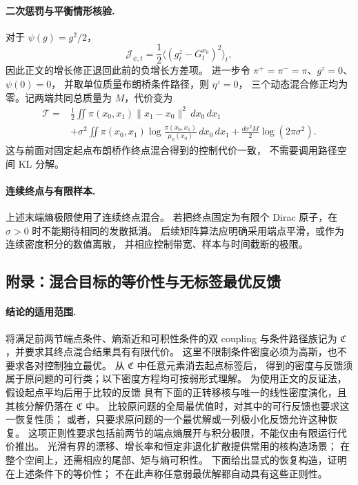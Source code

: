 \documentclass[UTF8,a4paper,11pt,fontset=fandol]{ctexart}
\begin{document}
\paragraph{二次惩罚与平衡情形核验.}
对于 $\psi(g)=g^2/2$，
\begin{equation}
\mathcal J_{\psi,t}
=\frac12\langle(g_t^z-G_t^{x_0})^2\rangle_t,
\end{equation}
因此正文的增长修正退回此前的负增长方差项。
进一步令 $\pi^+=\pi^-=\pi$、$g^z=0$、$\psi(0)=0$，
并取单位质量布朗桥条件路径，则 $\eta^z=0$，
三个动态混合修正均为零。记两端共同总质量为 $M$，代价变为
\begin{equation}
\begin{aligned}
\mathcal T
={}&\frac12\iint\pi(x_0,x_1)\|x_1-x_0\|^2\,dx_0\,dx_1\\
&+\sigma^2\iint\pi(x_0,x_1)
\log\frac{\pi(x_0,x_1)}{\mu_0(x_0)}\,dx_0\,dx_1
+\frac{d\sigma^2M}{2}\log(2\pi\sigma^2).
\end{aligned}
\end{equation}
这与前面对固定起点布朗桥作终点混合得到的控制代价一致，
不需要调用路径空间 KL 分解。

\paragraph{连续终点与有限样本.}
上述末端熵极限使用了连续终点混合。
若把终点固定为有限个 Dirac 原子，在 $\sigma>0$ 时不能期待相同的发散抵消。
后续矩阵算法应明确采用端点平滑，或作为连续密度积分的数值离散，
并相应控制带宽、样本与时间截断的极限。

\clearpage
\setcounter{equation}{0}
\renewcommand{\theequation}{C.\arabic{equation}}
\renewcommand{\theHequation}{C.\arabic{equation}}
\subsection*{附录：混合目标的等价性与无标签最优反馈}

\paragraph{结论的适用范围.}
将满足前两节端点条件、熵渐近和可积性条件的双 coupling 与条件路径族记为
$\mathfrak C$，并要求其终点混合结果具有有限代价。
这里不限制条件密度必须为高斯，也不要求各对控制独立最优。
从 $\mathfrak C$ 中任意元素消去起点标签后，
得到的密度与反馈须属于原问题的可行类；以下密度方程均可按弱形式理解。
为使用正文的反证法，假设起点平均后用于比较的反馈
具有下面的正转移核与唯一的线性密度演化，且其核分解仍落在 $\mathfrak C$ 中。
比较原问题的全局最优值时，对其中的可行反馈也要求这一恢复性质；
或者，只要求原问题的一个最优解或一列极小化反馈允许这种恢复。
这项正则性要求包括前两节的端点熵展开与积分极限，不能仅由有限运行代价推出。
光滑有界的漂移、增长率和恒定非退化扩散提供常用的核构造场景；
在整个空间上，还需相应的尾部、矩与熵可积性。
下面给出显式的恢复构造，证明在上述条件下的等价性；
不在此声称任意弱最优解都自动具有这些正则性。
\end{document}
